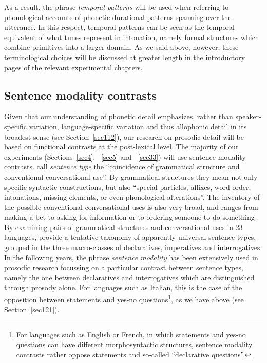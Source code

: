 As a result, the phrase \textit{temporal patterns} will be used when referring to phonological accounts of phonetic durational patterns spanning over the utterance. In this respect, temporal patterns can be seen as the temporal equivalent of what tunes represent in intonation, namely formal structures which combine primitives into a larger domain. As we said above, however, these terminological choices will be discussed at greater length in the introductory pages of the relevant experimental chapters.

\subsection{Sentence modality contrasts}\label{sec133}
Given that our understanding of phonetic detail emphasizes, rather than speaker-specific variation, language-specific variation and thus allophonic detail in its broadest sense (see Section~\ref{sec112}), our research on prosodic detail will be based on functional contrasts at the post-lexical level. The majority of our experiments (Sections~\ref{sec4}, ~\ref{sec5} and ~\ref{sec33}) will use sentence modality contrasts. \citet{sadock1985speech} call \textit{sentence type} the ``coincidence of grammatical structure and conventional conversational use''. By grammatical structures they mean not only specific syntactic constructions, but also ``special particles, affixes, word order, intonations, missing elements, or even phonological alterations''. The inventory of the possible conventional conversational uses is also very broad, and ranges from making a bet to asking for information or to ordering someone to do something \citep{lyons1977semantics}. By examining pairs of grammatical structures and conversational uses in 23 languages, \citet{sadock1985speech} provide a tentative taxonomy of apparently universal sentence types, grouped in the three macro-classes of declaratives, imperatives and interrogatives.  In the following years, the phrase \textit{sentence modality} has been extensively used in prosodic research focussing on a particular contrast between sentence types, namely the one between declaratives and interrogatives which are distinguished through prosody alone. For languages such as Italian, this is the case of the opposition between statements and yes-no questions\footnote{For languages such as English or French, in which statements and yes-no questions can have different morphosyntactic structures, sentence modality contrasts rather oppose statements and so-called ``declarative questions''.}, as we have above (see Section~\ref{sec121}).

